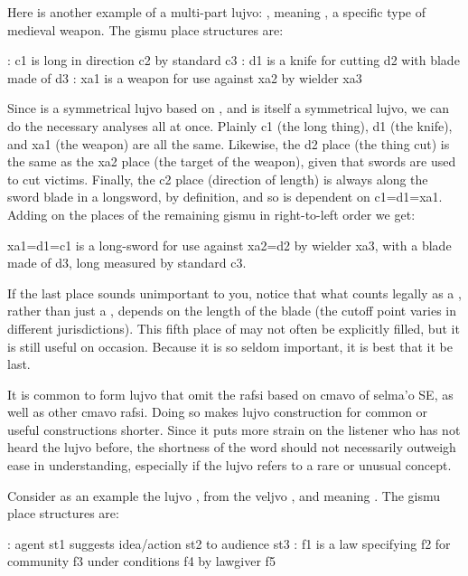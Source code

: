 Here is another example of a multi-part lujvo: ,
    meaning , a specific type of medieval weapon. The
    gismu place structures are:
\begin{example}
: c1 is long in direction c2 by standard c3\n
{}: d1 is a knife for cutting d2\n
\T	with blade made of d3\n
{}: xa1 is a weapon for use against xa2\n
\T	by wielder xa3
\end{example}

Since  is a symmetrical lujvo based on
    , and  is itself a symmetrical
    lujvo, we can do the necessary analyses all at once. Plainly c1
    (the long thing), d1 (the knife), and xa1 (the weapon) are all
    the same. Likewise, the d2 place (the thing cut) is the same as
    the xa2 place (the target of the weapon), given that swords are
    used to cut victims. Finally, the c2 place (direction of
    length) is always along the sword blade in a longsword, by
    definition, and so is dependent on c1=d1=xa1. Adding on the
    places of the remaining gismu in right-to-left order we get:
\begin{example}
xa1=d1=c1 is a long-sword for use against xa2=d2\n
\T	by wielder xa3, with a blade made of d3,\n
\T	long measured by standard c3.
\end{example}

If the last place sounds unimportant to you, notice that
    what counts legally as a , rather than just a
    , depends on the length of the blade (the cutoff point
    varies in different jurisdictions). This fifth place of
     may not often be explicitly filled, but it is
    still useful on occasion. Because it is so seldom important, it
    is best that it be last.



It is common to form lujvo that omit the rafsi based on
    cmavo of selma'o SE, as well as other cmavo rafsi. Doing so
    makes lujvo construction for common or useful constructions
    shorter. Since it puts more strain on the listener who has not
    heard the lujvo before, the shortness of the word should not
    necessarily outweigh ease in understanding, especially if the
    lujvo refers to a rare or unusual concept.

Consider as an example the lujvo , from the
    veljvo , and meaning . The
    gismu place structures are:
\begin{example}
: agent st1 suggests idea/action st2\n
\T	to audience st3\n
{}: f1 is a law specifying f2 for community f3\n
\T	under conditions f4 by lawgiver f5
\end{example}


